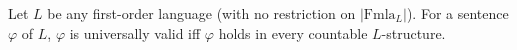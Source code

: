 Let $L$ be any first-order language (with no restriction on $|\mathrm{Fmla}_L|$). For a sentence $\varphi$ of $L$, $\varphi$ is universally valid iff $\varphi$ holds in every countable $L$-structure.
